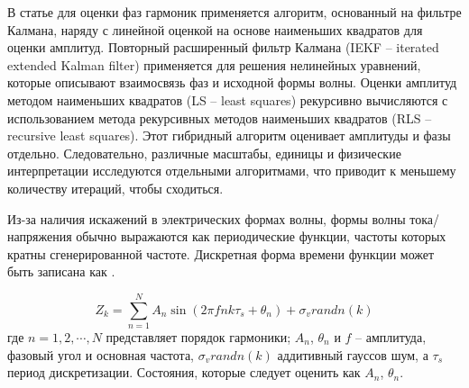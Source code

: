 

В статье \cite{enayati2017real} для оценки фаз гармоник применяется алгоритм, основанный на фильтре Калмана, наряду с линейной оценкой на основе наименьших квадратов для оценки амплитуд. Повторный расширенный фильтр Калмана (IEKF -- iterated extended Kalman filter) применяется для решения нелинейных уравнений, которые описывают взаимосвязь фаз и исходной формы волны. Оценки амплитуд методом наименьших квадратов (LS -- least squares) рекурсивно вычисляются с использованием метода рекурсивных методов наименьших квадратов (RLS -- recursive least squares). Этот гибридный алгоритм оценивает амплитуды и фазы отдельно. Следовательно, различные масштабы, единицы и физические интерпретации исследуются отдельными алгоритмами, что приводит к меньшему количеству итераций, чтобы сходиться. 

Из-за наличия искажений в электрических формах волны, формы волны тока/напряжения обычно выражаются как периодические функции, частоты которых кратны сгенерированной частоте. Дискретная форма времени функции может быть записана как \cite{moravej2014hybrid, 1193852, 4469961}.


\begin{equation}
\label{eq:equation1.19}
	Z_k = {\sum_{n=1}^{N} A_n \sin({2 \pi  f n  k  \tau_{s} + \theta_n}) + \sigma_v  randn(k)}
\end{equation}
где $n = 1, 2,\cdots, N$ представляет порядок гармоники; $A_n$, $\theta_n$ и $f$ -- амплитуда, фазовый угол и основная частота, $\sigma_v randn(k)$ аддитивный гауссов шум, а $\tau_s$ период дискретизации. Состояния, которые следует оценить как $A_n$, $\theta_n$.


